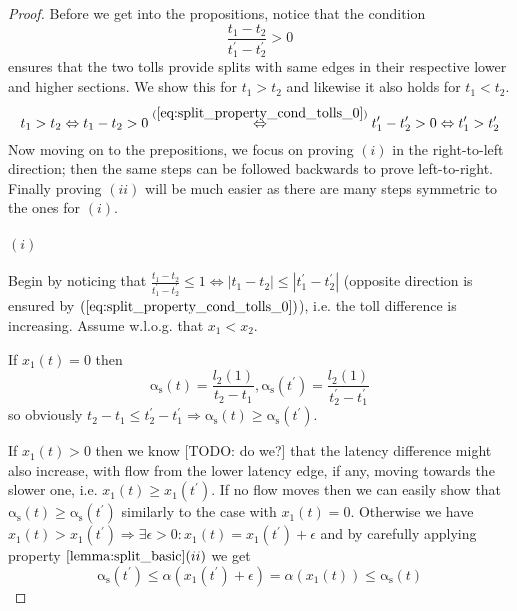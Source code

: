 \documentclass[a4paper,11pt]{article}
\newcommand{\LeftrightarrowArg}[1]{\stackrel{#1}{\Leftrightarrow}}
\newcommand{\as}{\mathrm{\alpha_s}}
\begin{document}
\begin{proof}
	Before we get into the propositions, notice that the condition
	\begin{equation}
		\frac{t_1 - t_2}{t_1^\prime - t_2^\prime} > 0
		\label{eq:split_property_cond_tolls_0}
	\end{equation}
	ensures that the two tolls provide splits with same edges in their respective lower and higher sections.
	We show this for $t_1 > t_2$ and likewise it also holds for $t_1 < t_2$.
	\[t_1 > t_2 \Leftrightarrow t_1 - t_2 > 0 \LeftrightarrowArg{(\ref{eq:split_property_cond_tolls_0})} t_1^\prime - t_2^\prime > 0 \Leftrightarrow t_1^\prime > t_2^\prime\]
	Now moving on to the prepositions, we focus on proving $(i)$ in the right-to-left direction; then the same steps can be followed backwards to prove left-to-right.
	Finally proving $(ii)$ will be much easier as there are many steps symmetric to the ones for $(i)$.
	
	\paragraph{$(i)$}
	Begin by noticing that $\frac{t_1 - t_2}{t_1^\prime - t_2^\prime} \le 1 \Leftrightarrow |t_1 - t_2| \le |t_1^\prime - t_2^\prime|$ (opposite direction is ensured by $(\ref{eq:split_property_cond_tolls_0})$), i.e. the toll difference is increasing.
	Assume w.l.o.g. that $x_1 < x_2$.
	
	If $x_1(t) = 0$ then
	\[\as(t) = \frac{l_2(1)}{t_2 - t_1}, \as(t^\prime) = \frac{l_2(1)}{t_2^\prime - t_1^\prime}\] 
	so obviously $t_2 - t_1 \le t_2^\prime - t_1^\prime \Rightarrow \as(t) \ge \as(t^\prime)$.
	
	If $x_1(t) > 0$ then we know [TODO: do we?] that the latency difference might also increase, with flow from the lower latency edge, if any, moving towards the slower one, i.e. $x_1(t) \ge x_1(t^\prime)$.
	If no flow moves then we can easily show that $\as(t) \ge \as(t^\prime)$ similarly to the case with $x_1(t) = 0$.
	Otherwise we have $x_1(t) > x_1(t^\prime) \Rightarrow \exists \epsilon > 0: x_1(t) = x_1(t^\prime) + \epsilon$ and by carefully applying property $\ref{lemma:split_basic}(ii)$ we get
	\[\as(t^\prime) \le \alpha(x_1(t^\prime) + \epsilon) = \alpha(x_1(t)) \le \as(t)\]
	

\end{proof}
\end{document}
